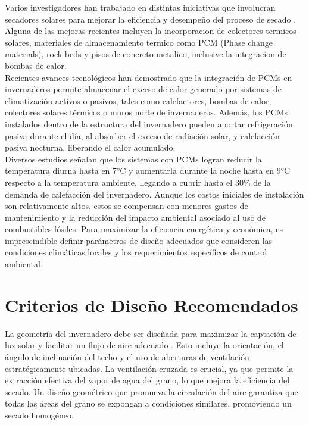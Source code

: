 \documentclass[12pt]{article}
\begin{document}
Varios investigadores han trabajado en distintas iniciativas que involucran secadores solares para mejorar la eficiencia y desempeño del proceso de secado \cite{Tiwari2018}. Alguna de las mejoras recientes incluyen la incorporacion de colectores termicos solares, materiales de almacenamiento termico como PCM (Phase change materials)\cite{Tiwari2016b}, rock beds y pisos de concreto metalico, inclusive la integracion de bombas de calor. \\


Recientes avances tecnológicos han demostrado que la integración de PCMs en invernaderos permite almacenar el exceso de calor generado por sistemas de climatización activos o pasivos, tales como calefactores, bombas de calor, colectores solares térmicos o muros norte de invernaderos. Además, los PCMs instalados dentro de la estructura del invernadero pueden aportar refrigeración pasiva durante el día, al absorber el exceso de radiación solar, y calefacción pasiva nocturna, liberando el calor acumulado.\\

Diversos estudios señalan que los sistemas con PCMs logran reducir la temperatura diurna hasta en 7°C y aumentarla durante la noche hasta en 9°C respecto a la temperatura ambiente, llegando a cubrir hasta el 30\% de la demanda de calefacción del invernadero. Aunque los costos iniciales de instalación son relativamente altos, estos se compensan con menores gastos de mantenimiento y la reducción del impacto ambiental asociado al uso de combustibles fósiles. Para maximizar la eficiencia energética y económica, es imprescindible definir parámetros de diseño adecuados que consideren las condiciones climáticas locales y los requerimientos específicos de control ambiental.



\section{Criterios de Diseño Recomendados}



La geometría del invernadero debe ser diseñada para maximizar la captación de luz solar y facilitar un flujo de aire adecuado \cite{martinez_estrada_solar_2004}. Esto incluye la orientación, el ángulo de inclinación del techo y el uso de aberturas de ventilación estratégicamente ubicadas. La ventilación cruzada es crucial, ya que permite la extracción efectiva del vapor de agua del grano, lo que mejora la eficiencia del secado. Un diseño geométrico que promueva la circulación del aire garantiza que todas las áreas del grano se expongan a condiciones similares, promoviendo un secado homogéneo.\\
\end{document}
